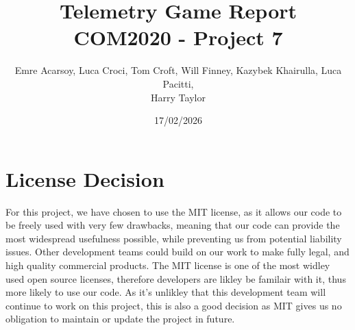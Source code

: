 \documentclass[11pt]{article}
\title{Telemetry Game Report\\[0.3em]
\large COM2020 - Project 7}
\author{Emre Acarsoy, Luca Croci, Tom Croft, Will Finney, Kazybek Khairulla, Luca Pacitti, \\ Harry Taylor}
\date{17/02/2026}
\begin{document}
\section{License Decision}

For this project, we have chosen to use the MIT license, as it allows our code to be freely used with very few drawbacks, meaning that our code can provide the most widespread usefulness possible, while preventing us from potential liability issues. Other development teams could build on our work to make fully legal, and high quality commercial products. The MIT license is one of the most widley used open source licenses, therefore developers are likley be familair with it, thus more likely to use our code. As it's unlikley that this development team will continue to work on this project, this is also a good decision as MIT gives us no obligation to maintain or update the project in future.
\end{document}
